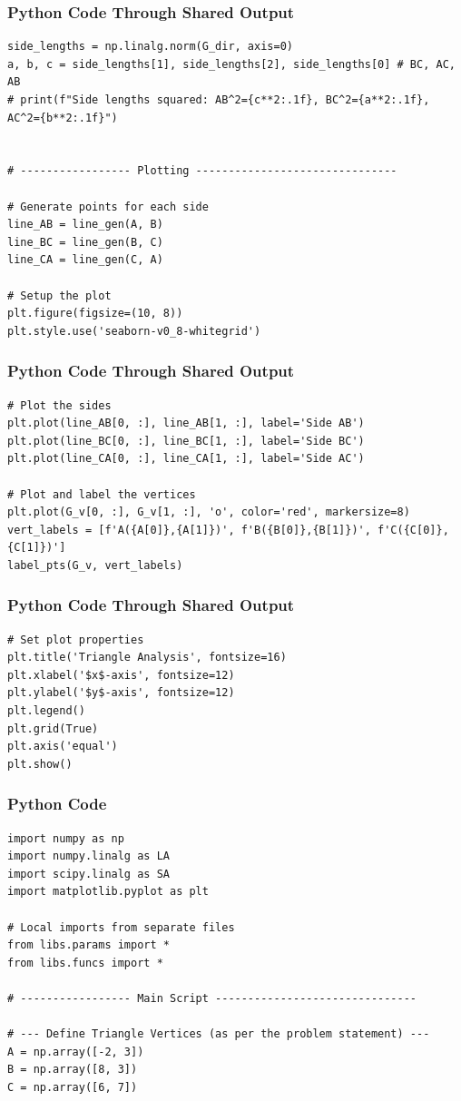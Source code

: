 \documentclass{beamer}
\begin{document}
\begin{frame}[fragile]
\frametitle{Python Code Through Shared Output}
\begin{lstlisting}
side_lengths = np.linalg.norm(G_dir, axis=0)
a, b, c = side_lengths[1], side_lengths[2], side_lengths[0] # BC, AC, AB
# print(f"Side lengths squared: AB^2={c**2:.1f}, BC^2={a**2:.1f}, AC^2={b**2:.1f}")


# ----------------- Plotting -------------------------------

# Generate points for each side
line_AB = line_gen(A, B)
line_BC = line_gen(B, C)
line_CA = line_gen(C, A)

# Setup the plot
plt.figure(figsize=(10, 8))
plt.style.use('seaborn-v0_8-whitegrid')
\end{lstlisting}
\end{frame}  

\begin{frame}[fragile]
\frametitle{Python Code Through Shared Output}
\begin{lstlisting}
# Plot the sides
plt.plot(line_AB[0, :], line_AB[1, :], label='Side AB')
plt.plot(line_BC[0, :], line_BC[1, :], label='Side BC')
plt.plot(line_CA[0, :], line_CA[1, :], label='Side AC')

# Plot and label the vertices
plt.plot(G_v[0, :], G_v[1, :], 'o', color='red', markersize=8)
vert_labels = [f'A({A[0]},{A[1]})', f'B({B[0]},{B[1]})', f'C({C[0]},{C[1]})']
label_pts(G_v, vert_labels)
\end{lstlisting}
\end{frame}  

\begin{frame}[fragile]
\frametitle{Python Code Through Shared Output}
\begin{lstlisting}
# Set plot properties
plt.title('Triangle Analysis', fontsize=16)
plt.xlabel('$x$-axis', fontsize=12)
plt.ylabel('$y$-axis', fontsize=12)
plt.legend()
plt.grid(True)
plt.axis('equal')
plt.show()

\end{lstlisting}
\end{frame}   

\begin{frame}[fragile]
\frametitle{Python Code}
\begin{lstlisting}
import numpy as np
import numpy.linalg as LA
import scipy.linalg as SA
import matplotlib.pyplot as plt

# Local imports from separate files
from libs.params import *
from libs.funcs import *

# ----------------- Main Script -------------------------------

# --- Define Triangle Vertices (as per the problem statement) ---
A = np.array([-2, 3])
B = np.array([8, 3])
C = np.array([6, 7])
\end{lstlisting}
\end{frame}  
\end{document}
